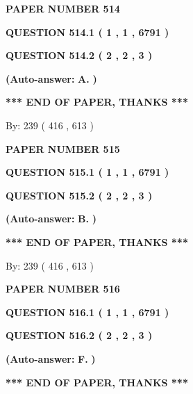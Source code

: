 \documentclass[12pt]{article}
\begin{document}
   
 {\textbf{ \Large{ PAPER NUMBER  514  }}}
   
   
   
   
  
  
{\textbf{\large{QUESTION
514.1 
 ( 1 , 1 , 6791 )
}}}
  
  
{\textbf{\large{QUESTION
514.2 
 ( 2 , 2 , 3 )
}}}
 
 
{\textbf{(Auto-answer:}}
{\textbf{\large{
A.}}}
{\textbf{)}}
 
 
   
   
   
   
\vspace{1.0in} 
{\textbf{\large{ *** END OF PAPER, THANKS *** }}} 
   
   
\hspace{1.0in} By: 
 239 ( 416 ,  613 )
   
   
   
   
\newpage 
\setcounter{page}{ 
   515001 } 
   
   
 {\textbf{ \Large{ PAPER NUMBER  515  }}}
   
   
   
   
  
  
{\textbf{\large{QUESTION
515.1 
 ( 1 , 1 , 6791 )
}}}
  
  
{\textbf{\large{QUESTION
515.2 
 ( 2 , 2 , 3 )
}}}
 
 
{\textbf{(Auto-answer:}}
{\textbf{\large{
B.}}}
{\textbf{)}}
 
 
   
   
   
   
\vspace{1.0in} 
{\textbf{\large{ *** END OF PAPER, THANKS *** }}} 
   
   
\hspace{1.0in} By: 
 239 ( 416 ,  613 )
   
   
   
   
\newpage 
\setcounter{page}{ 
   516001 } 
   
   
 {\textbf{ \Large{ PAPER NUMBER  516  }}}
   
   
   
   
  
  
{\textbf{\large{QUESTION
516.1 
 ( 1 , 1 , 6791 )
}}}
  
  
{\textbf{\large{QUESTION
516.2 
 ( 2 , 2 , 3 )
}}}
 
 
{\textbf{(Auto-answer:}}
{\textbf{\large{
F.}}}
{\textbf{)}}
 
 
   
   
   
   
\vspace{1.0in} 
{\textbf{\large{ *** END OF PAPER, THANKS *** }}} 
   
\end{document}
